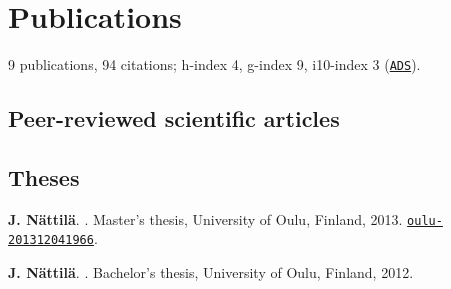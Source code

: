 \documentclass[10pt]{article}
\begin{document}

\section*{Publications}
9 publications, 94 citations; h-index 4, g-index 9, i10-index 3 (\href{http://adsabs.harvard.edu/cgi-bin/abs_connect?author=nattila,+J.&aut_syn=YES&return_req=no_params}{\nolinkurl{ADS}}).
\subsection*{\phantom{sub} Peer-reviewed scientific articles}

\vspace{-20pt}
\renewcommand\refname{\phantom{bla}}



\nocite{*}


\subsection*{}
\subsection*{}
\subsection*{\phantom{sub} Theses}

\vspace{-20pt}
%
\begin{thebibliography}{3}

\textbf{J. N\"attil\"a}.
.
\newblock Master's thesis, University of Oulu, Finland, 2013. \href{http://urn.fi/URN:NBN:fi:oulu-201312041966}{\nolinkurl{oulu-201312041966}}.

\textbf{J. N\"attil\"a}.
.
\newblock Bachelor's thesis, University of Oulu, Finland, 2012.

\end{thebibliography}
\end{document}
